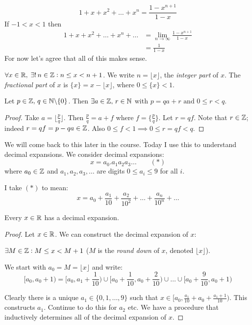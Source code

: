 \documentclass[10pt]{scrartcl}
\begin{document}
\begin{remark}
\[1 + x + x^2 + \dots + x^n = \frac{1-x^{n+1}}{1-x}\]
If $-1 < x < 1$ then 
\[
\begin{aligned}
  1 + x + x^2 + \dots + x^n + \dots &= \lim_{n\to \infty}\frac{1-x^{n+1}}{1-x}\\
  &= \frac{1}{1-x}
\end{aligned}
\]
For now let's agree that all of this makes sense. 
\end{remark}


\begin{theorem} 
$\forall x \in\mathbb{R}, \;\exists!\,n \in\mathbb{Z} : n \leq x < n+1$. We write $n = \lfloor x \rfloor$, the \emph{integer part} of $x$. The \emph{fractional part} of $x$ is $\{x\} = x - \lfloor x\rfloor$, where $0 \leq \{x\} < 1$. 	
\end{theorem}\vspace*{5pt}

\begin{corollary}
	Let $p \in\mathbb{Z},\, q \in\mathbb{N}\backslash\{0\}$. Then $\exists a \in\mathbb{Z},\, r \in\mathbb{N}$ with 
	$p = qa + r \text{ and } 0 \leq r < q$. 
\end{corollary}
\begin{proof}
Take $a = \lfloor \frac{p}{q}\rfloor$. Then $\frac{p}{q} = a + f$ where $f = \{\frac{p}{q}\}$. Let $r = qf$. Note that $r \in\mathbb{Z}$; indeed $r = qf = p-qa \in\mathbb{Z}$. Also $0 \leq f < 1 \implies 0 \leq r = qf < q.$ 	
\end{proof}

We will come back to this later in the course. Today I use this to understand decimal expansions. We consider decimal expansions: 
\[x = a_0 . a_1a_2a_3 \dots \qquad (*)\]
where $a_0 \in\mathbb{Z}$ and $a_1,a_2,a_3,\dots$ are digits $0 \leq a_i \leq 9$ for all $i$. 

I take $(*)$ to mean: 
\[x = a_0 + \frac{a_1}{10} + \frac{a_2}{10^2} + \dots + \frac{a_n}{10^n}+ \dots\]

\begin{theorem}
Every $x\in\mathbb{R}$ has a decimal expansion. 	
\end{theorem}

\begin{proof}
Let $x\in\mathbb{R}$. We can construct the decimal expansion of $x$: 

$\exists M \in\mathbb{Z} : M \leq x < M+1$ ($M$ is the \emph{round down} of $x$, denoted $\lfloor x \rfloor$). 

We start with $a_0 = M = \lfloor x \rfloor$ and write: 
\[[a_0, a_0+1) = [a_0,a_1 + \frac{1}{10}) \cup [a_0 + \frac{1}{10}, a_0+\frac{2}{10})\cup \dots\cup [a_0 + \frac{9}{10},a_0 + 1)\]	

Clearly there is a unique $a_1 \in \{0,1,\dots,9\}$ such that $x \in [a_0, \frac{a_1}{10} + a_0 + \frac{a_1 + 1}{10})$. This constructs $a_1$. Continue to do this for $a_2$ etc. We have a procedure that inductively determines all of the decimal expansion of $x$. 
\end{proof}\vspace*{5pt}
\end{document}

